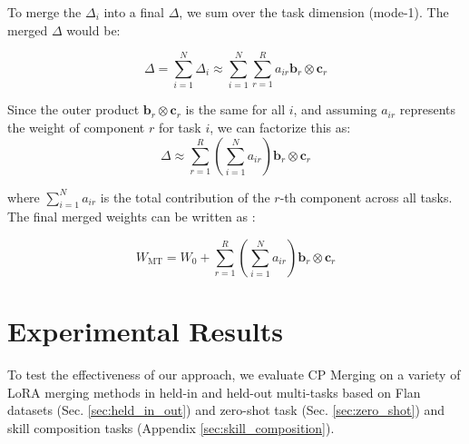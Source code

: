 \documentclass[10pt]{article} %
\begin{document}
    To merge the $\Delta_{i}$ into a final $\Delta$, we sum over the task dimension
    (mode-1). The merged $\Delta$ would be:

    \begin{equation}
        \Delta = \sum_{i=1}^{N}\Delta_{i}\approx \sum_{i=1}^{N}\sum_{r=1}^{R}a_{ir}
        \mathbf{b}_{r}\otimes \mathbf{c}_{r}
    \end{equation}

    Since the outer product $\textbf{b}_{r}\otimes \textbf{c}_{r}$ is the same for
    all $i$, and assuming $a_{ir}$ represents the weight of
    component $r$ for task $i$, we can factorize this as:
    \begin{equation}
        \label{eq:cp_merge}\Delta \approx \sum_{r=1}^{R}\left( \sum_{i=1}^{N}a_{ir}
        \right) \mathbf{b}_{r}\otimes \mathbf{c}_{r}
    \end{equation}

    where $\sum_{i=1}^{N}a_{ir}$ is the total contribution of the $r$-th component
    across all tasks. The final merged weights can be written as :

    \begin{equation}
        W_{\mathrm{MT}}=W_{0}+\sum_{r=1}^{R}\left( \sum_{i=1}^{N}a_{ir}\right) \textbf
        {b}_{r}\otimes \textbf{c}_{r}
    \end{equation}

\section{Experimental Results}

    To test the effectiveness of our approach, we evaluate CP Merging on a
    variety of LoRA merging methods in held-in and held-out multi-tasks based on Flan datasets (Sec. \ref{sec:held_in_out})\cite{arnobexploring,ostapenko2024towards}
    and zero-shot task (Sec. \ref{sec:zero_shot})\cite{ostapenko2024towards} and skill composition tasks (Appendix \ref{sec:skill_composition})\cite{prabhakar2025lora}.
\end{document}

